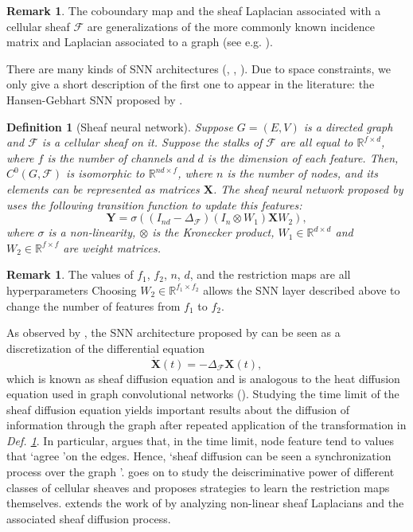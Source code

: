 \documentclass[11pt,a4paper,openright,twoside]{report}
\theoremstyle{plain}
\newtheorem{definition}[proposition]{Definition}
\theoremstyle{definition}
\newtheorem{remark}[proposition]{Remark}
\begin{document}
\begin{remark}
  The coboundary map and the sheaf Laplacian associated with a cellular sheaf $\mathcal{F}$ are generalizations of the more commonly known incidence matrix and Laplacian associated to a graph (see e.g. \cite{ward2022practical}).
\end{remark}

There are many kinds of SNN architectures (\cite{hansen2020sheaf}, \cite{bodnar2022neural}, \cite{zaghen2024nonlinear}). Due to space constraints, we only give a short description of the first one to appear in the literature: the Hansen-Gebhart SNN proposed by \cite{hansen2020sheaf}.

\begin{definition}[Sheaf neural network]
  \label{def: sheafnn}
  Suppose $G = (E,V)$ is a directed graph and $\mathcal{F}$ is a cellular sheaf on it. Suppose the stalks of $\mathcal{F}$ are all equal to $\mathbb{R}^{f \times d}$, where $f$ is the number of channels and $d$ is the dimension of each feature. Then, $C^0(G, \mathcal{F})$ is isomorphic to $\mathbb{R}^{nd \times f}$, where $n$ is the number of nodes, and its elements can be represented as matrices $\mathbf{X}$. The sheaf neural network proposed by \cite{hansen2020sheaf} uses the following transition function to update this features:
  \[\mathbf{Y} = \sigma((I_{nd} - \Delta_{\mathcal{F}})(I_{n} \otimes W_1)\mathbf{X}W_2),\]
  where $\sigma$ is a non-linearity, $\otimes$ is the Kronecker product, $W_1 \in \mathbb{R}^{d \times d}$ and $W_2 \in \mathbb{R}^{f \times f}$ are weight matrices.
\end{definition}

\begin{remark}
  The values of $f_1$, $f_2$, $n$, $d$, and the restriction maps are all hyperparameters
  Choosing $W_2 \in \mathbb{R}^{f_1 \times f_2}$ allows the SNN layer described above to change the number of features from $f_1$ to $f_2$.  
\end{remark}

As observed by \cite{bodnar2022neural}, the SNN architecture proposed by \cite{hansen2020sheaf} can be seen as a discretization of the differential equation 
\[\dot{\mathbf{X}}(t) = -\Delta_{\mathcal{F}}\mathbf{X}(t),\]
which is known as sheaf diffusion equation and is analogous to the heat diffusion equation used in graph convolutional networks (\cite{bodnar2022neural}). Studying the time limit of the sheaf diffusion equation yields important results about the diffusion of information through the graph after repeated application of the transformation in \textit{Def. \ref{def: sheafnn}}. In particular, \cite{bodnar2022neural} argues that, in the time limit, node feature tend to values that \lq agree \rq on the edges. Hence, \lq sheaf diffusion can be seen a synchronization process over the graph \rq. \cite{bodnar2022neural} goes on to study the deiscriminative power of different classes of cellular sheaves and proposes strategies to learn the restriction maps themselves. \cite{zaghen2024nonlinear} extends the work of \cite{bodnar2022neural} by analyzing non-linear sheaf Laplacians and the associated sheaf diffusion process.
\end{document}
